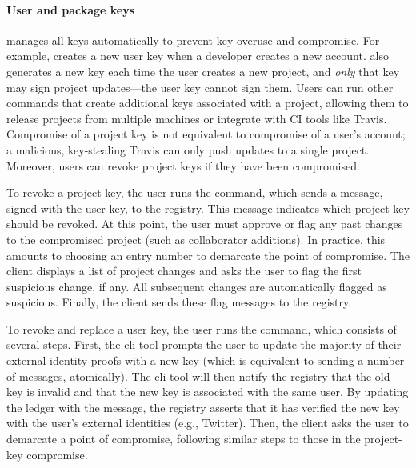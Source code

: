 
\paragraph{User and package keys}
\spam{} manages all keys automatically to prevent key overuse and
compromise. For example, \spam{} creates a new user key
when a developer creates a new account. \spam{} also
generates a new key each time the user creates a new project, and \emph{only}
that key may sign project updates---the user key cannot sign them.
Users can run other \spam{} commands that create additional keys
associated with a project, allowing them to release projects from multiple
machines or integrate with CI tools like Travis. Compromise of a project key is not equivalent to
compromise of a user's account; a malicious, key-stealing Travis can
only push updates to a single project. Moreover, users can revoke
project keys if they have been compromised.

To revoke a project key, the user runs the \revokeprojkeycmd{} command, which
sends a message, signed with the user key, to the registry. This message
indicates which project key should be revoked. At this point, the user
must approve or flag any past changes to the compromised project
(such as collaborator additions). In practice, this amounts to choosing an
entry number to demarcate the point of compromise. The \spam{} client
displays a list of project changes and asks the user to flag the first
suspicious change, if any. All subsequent changes are
automatically flagged as suspicious. Finally, the \spam client sends
these flag messages to the registry.

To revoke and replace a user key, the user runs the \replaceuserkeycmd{} command, which
consists of several steps. First, the cli tool prompts the user to update
the majority of their external identity proofs with a new key (which is equivalent to
sending a number of \proveidentity messages, atomically). The cli tool
will then notify the registry that the old key is invalid and that the new key is associated
with the same user. By updating the ledger with the \replaceuserkey{} message, the
registry asserts that it has verified the new key with the user's external identities
(e.g., Twitter). Then, the \spam client asks the user to demarcate
a point of compromise, following similar steps to those in the project-key
compromise. 

